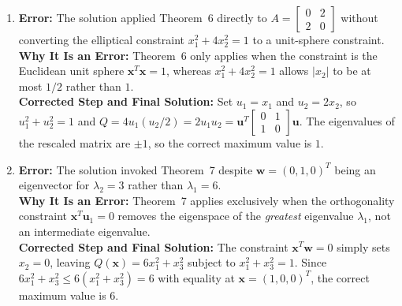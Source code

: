 \documentclass[11pt, letterpaper]{article}
\theoremstyle{definition}
\theoremstyle{remark}
\begin{document}
\begin{enumerate}[label=\textbf{Key \arabic*:}]
    \item \textbf{Error:} The solution applied Theorem~6 directly to $A = \begin{bmatrix} 0 & 2 \\ 2 & 0 \end{bmatrix}$ without converting the elliptical constraint $x_1^2 + 4x_2^2 = 1$ to a unit-sphere constraint.\\
    \textbf{Why It Is an Error:} Theorem~6 only applies when the constraint is the Euclidean unit sphere $\mathbf{x}^T \mathbf{x} = 1$, whereas $x_1^2 + 4x_2^2 = 1$ allows $|x_2|$ to be at most $1/2$ rather than $1$.\\
    \textbf{Corrected Step and Final Solution:} Set $u_1 = x_1$ and $u_2 = 2x_2$, so $u_1^2 + u_2^2 = 1$ and $Q = 4 u_1 (u_2 / 2) = 2 u_1 u_2 = \mathbf{u}^T \begin{bmatrix} 0 & 1 \\ 1 & 0 \end{bmatrix}\mathbf{u}$. The eigenvalues of the rescaled matrix are $\pm 1$, so the correct maximum value is $1$.

    \item \textbf{Error:} The solution invoked Theorem~7 despite $\mathbf{w} = (0, 1, 0)^T$ being an eigenvector for $\lambda_2 = 3$ rather than $\lambda_1 = 6$.\\
    \textbf{Why It Is an Error:} Theorem~7 applies exclusively when the orthogonality constraint $\mathbf{x}^T \mathbf{u}_1 = 0$ removes the eigenspace of the \emph{greatest} eigenvalue $\lambda_1$, not an intermediate eigenvalue.\\
    \textbf{Corrected Step and Final Solution:} The constraint $\mathbf{x}^T \mathbf{w} = 0$ simply sets $x_2 = 0$, leaving $Q(\mathbf{x}) = 6x_1^2 + x_3^2$ subject to $x_1^2 + x_3^2 = 1$. Since $6x_1^2 + x_3^2 \le 6(x_1^2 + x_3^2) = 6$ with equality at $\mathbf{x} = (1, 0, 0)^T$, the correct maximum value is $6$.
\end{enumerate}
\end{document}
